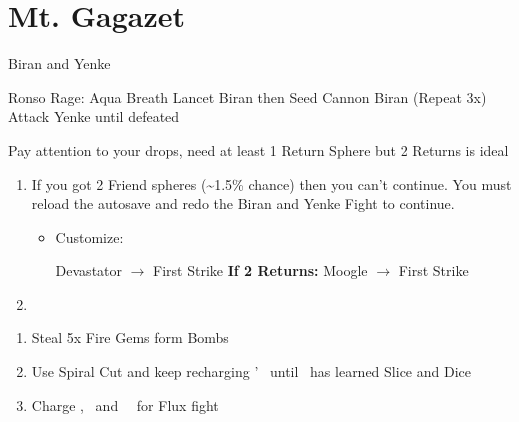 \chapter{Mt. Gagazet}
\begin{battle}{Biran and Yenke}
	\begin{itemize}
		\kimahrif Ronso Rage: Aqua Breath
		\kimahrif Lancet Biran then Seed Cannon Biran (Repeat 3x)
		\kimahrif Attack Yenke until defeated
	\end{itemize}
	Pay attention to your drops, need at least 1 Return Sphere but 2 Returns is ideal
\end{battle}
\begin{enumerate}[resume]
	\item If you got 2 Friend spheres (\textasciitilde1.5\% chance) then you can't continue. You must reload the autosave and redo the Biran and Yenke Fight to continue.
		\begin{itemize}
			\item Customize:
			\begin{itemize}
				\rikkuf Devastator $\rightarrow$ First Strike
				\luluf \textbf{If 2 Returns:} Moogle $\rightarrow$ First Strike
			\end{itemize}
		\end{itemize}
	\item \formation{\tidus}{\rikku}{\lulu}
\end{enumerate}
\begin{enumerate}[resume]
	\item Steal 5x Fire Gems form Bombs
	\item Use Spiral Cut and keep recharging \tidus' \od\ until \tidus\ has learned Slice and Dice
	\item Charge \rikku, \lulu\ and \tidus\ \od\ for Flux fight
\end{enumerate}
